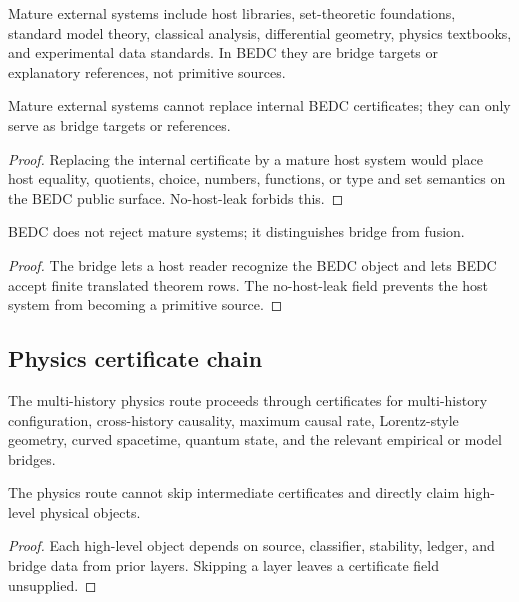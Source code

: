 \begin{definition}
\label{def:philosophy-mature-external-system}
Mature external systems include host libraries, set-theoretic
foundations, standard model theory, classical analysis, differential
geometry, physics textbooks, and experimental data standards. In BEDC
they are bridge targets or explanatory references, not primitive
sources.
\end{definition}

\begin{theorem}
\label{thm:philosophy-mature-systems-bridge-targets}
Mature external systems cannot replace internal BEDC certificates; they
can only serve as bridge targets or references.
\end{theorem}
\begin{proof}
Replacing the internal certificate by a mature host system would place
host equality, quotients, choice, numbers, functions, or type and set
semantics on the BEDC public surface. No-host-leak forbids this.
\end{proof}

\begin{corollary}
\label{cor:philosophy-bedc-bridges-mature-systems}
BEDC does not reject mature systems; it distinguishes bridge from
fusion.
\end{corollary}
\begin{proof}
The bridge lets a host reader recognize the BEDC object and lets BEDC
accept finite translated theorem rows. The no-host-leak field prevents
the host system from becoming a primitive source.
\end{proof}

\subsection{Physics certificate chain}
\label{subsec:philosophy-physics-certificate-chain}

\begin{definition}
\label{def:philosophy-multi-history-physics-chain}
The multi-history physics route proceeds through certificates for
multi-history configuration, cross-history causality, maximum causal
rate, Lorentz-style geometry, curved spacetime, quantum state, and the
relevant empirical or model bridges.
\end{definition}

\begin{theorem}
\label{thm:philosophy-physics-closes-stepwise}
The physics route cannot skip intermediate certificates and directly
claim high-level physical objects.
\end{theorem}
\begin{proof}
Each high-level object depends on source, classifier, stability,
ledger, and bridge data from prior layers. Skipping a layer leaves a
certificate field unsupplied.
\end{proof}


